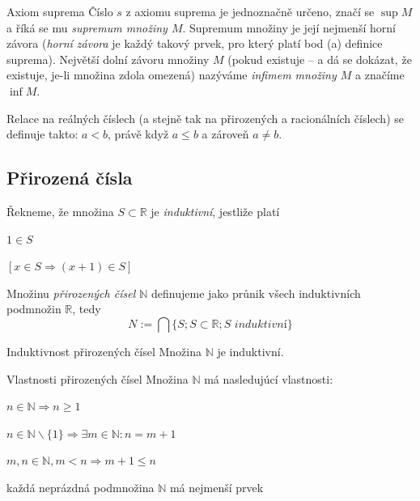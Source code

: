 \begin{penumerate}
\begin{definiceN}{Axiom suprema}
		Číslo $s$ z axiomu suprema je jednoznačně určeno, značí se $\sup M$ a říká se mu \emph{supremum množiny $M$}. Supremum množiny je její nejmenší horní závora (\emph{horní závora} je každý takový prvek, pro který platí bod (a) definice suprema). Největší dolní závoru množiny $M$ (pokud existuje -- a dá se dokázat, že existuje, je-li množina zdola omezená) nazýváme \emph{infimem množiny $M$} a značíme $\inf M$.
		\end{definiceN}
\end{penumerate}

\begin{poznamka}
Relace \uv{$<$} na reálných číslech (a stejně tak na přirozených a racionálních číslech) se definuje takto: $a<b$, právě když $a\leq b$ a zároveň $a\neq b$.
\end{poznamka}

\subsection{Přirozená čísla}

\begin{definice}
	Řekneme, že množina $S \subset \mathbb{R}$ je \emph{induktivní}, jestliže platí
	\begin{pitemize}
		\item $1 \in S$
		\item $[x \in S \Rightarrow (x+1) \in S]$
	\end{pitemize}
	Množinu \emph{přirozených čísel $\mathbb{N}$} definujeme jako průnik všech induktivních podmnožin $\mathbb{R}$, tedy
	$$
		N := \bigcap \{ S; S \subset \mathbb{R}; \textit{S induktivní}\}
	$$
\end{definice}

\begin{vetaN}{Induktivnost přirozených čísel}
	Množina $\mathbb{N}$ je induktivní.
\end{vetaN}

\begin{vetaN}{Vlastnosti přirozených čísel}
	Množina $\mathbb{N}$ má nasledujúcí vlastnosti:
	\begin{penumerate}
		\item $n \in \mathbb{N} \Rightarrow n \ge 1$
		\item $n \in \mathbb{N} \backslash \{1\} \Rightarrow \exists m \in \mathbb{N}: n=m+1$
		\item $m,n \in \mathbb{N}, m < n \Rightarrow m + 1 \le n$ %
		\item každá neprázdná podmnožina $\mathbb{N}$ má nejmenší prvek
	\end{penumerate}
\end{vetaN}

